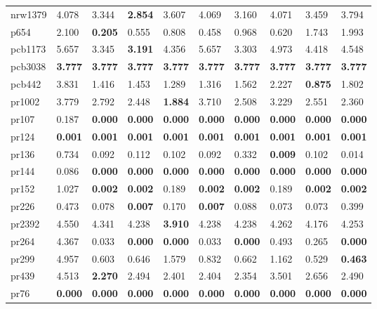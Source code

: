 \begin{tabular}{llllllllll}
nrw1379 & 4.078 & 3.344 & \textbf{2.854} & 3.607 & 4.069 & 3.160 & 4.071 & 3.459 & 3.794 \\
p654 & 2.100 & \textbf{0.205} & 0.555 & 0.808 & 0.458 & 0.968 & 0.620 & 1.743 & 1.993 \\
pcb1173 & 5.657 & 3.345 & \textbf{3.191} & 4.356 & 5.657 & 3.303 & 4.973 & 4.418 & 4.548 \\
pcb3038 & \textbf{3.777} & \textbf{3.777} & \textbf{3.777} & \textbf{3.777} & \textbf{3.777} & \textbf{3.777} & \textbf{3.777} & \textbf{3.777} & \textbf{3.777} \\
pcb442 & 3.831 & 1.416 & 1.453 & 1.289 & 1.316 & 1.562 & 2.227 & \textbf{0.875} & 1.802 \\
pr1002 & 3.779 & 2.792 & 2.448 & \textbf{1.884} & 3.710 & 2.508 & 3.229 & 2.551 & 2.360 \\
pr107 & 0.187 & \textbf{0.000} & \textbf{0.000} & \textbf{0.000} & \textbf{0.000} & \textbf{0.000} & \textbf{0.000} & \textbf{0.000} & \textbf{0.000} \\
pr124 & \textbf{0.001} & \textbf{0.001} & \textbf{0.001} & \textbf{0.001} & \textbf{0.001} & \textbf{0.001} & \textbf{0.001} & \textbf{0.001} & \textbf{0.001} \\
pr136 & 0.734 & 0.092 & 0.112 & 0.102 & 0.092 & 0.332 & \textbf{0.009} & 0.102 & 0.014 \\
pr144 & 0.086 & \textbf{0.000} & \textbf{0.000} & \textbf{0.000} & \textbf{0.000} & \textbf{0.000} & \textbf{0.000} & \textbf{0.000} & \textbf{0.000} \\
pr152 & 1.027 & \textbf{0.002} & \textbf{0.002} & 0.189 & \textbf{0.002} & \textbf{0.002} & 0.189 & \textbf{0.002} & \textbf{0.002} \\
pr226 & 0.473 & 0.078 & \textbf{0.007} & 0.170 & \textbf{0.007} & 0.088 & 0.073 & 0.073 & 0.399 \\
pr2392 & 4.550 & 4.341 & 4.238 & \textbf{3.910} & 4.238 & 4.238 & 4.262 & 4.176 & 4.253 \\
pr264 & 4.367 & 0.033 & \textbf{0.000} & \textbf{0.000} & 0.033 & \textbf{0.000} & 0.493 & 0.265 & \textbf{0.000} \\
pr299 & 4.957 & 0.603 & 0.646 & 1.579 & 0.832 & 0.662 & 1.162 & 0.529 & \textbf{0.463} \\
pr439 & 4.513 & \textbf{2.270} & 2.494 & 2.401 & 2.404 & 2.354 & 3.501 & 2.656 & 2.490 \\
pr76 & \textbf{0.000} & \textbf{0.000} & \textbf{0.000} & \textbf{0.000} & \textbf{0.000} & \textbf{0.000} & \textbf{0.000} & \textbf{0.000} & \textbf{0.000} \\

\end{tabular}
